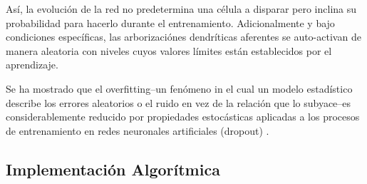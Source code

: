 
Así, la evolución de la red no predetermina una célula a disparar pero inclina su probabilidad para hacerlo durante el entrenamiento. Adicionalmente y bajo condiciones específicas, las arborizaciónes dendríticas aferentes se auto-activan de manera aleatoria con niveles cuyos valores límites están establecidos por el aprendizaje.


Se ha mostrado que el overfitting--un fenómeno in el cual un modelo estadístico describe los errores aleatorios o el ruido en vez de la relación que lo subyace--es considerablemente reducido por propiedades estocásticas aplicadas a los procesos de entrenamiento en redes neuronales artificiales (dropout) \cite{JMLR:v15:srivastava14a}.






\subsection{Implementación Algorítmica}

\subsubsection{}
\label{mrstsa}

